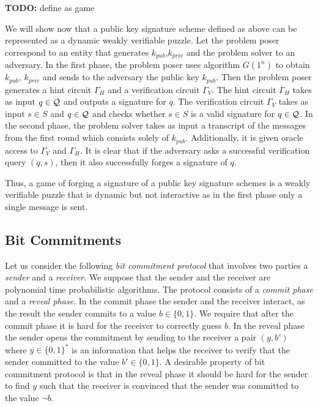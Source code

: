 %
\begin{todo}
  \textbf{TODO:} define as game
\end{todo}
We will show now that a public key signature scheme defined as above can be represented as a dynamic weakly verifiable puzzle.
Let the problem poser correspond to an entity that generates $k_{pub}$,$k_{priv}$ and the problem solver to an adversary.
In the first phase, the problem poser uses algorithm $G(1^n)$ to obtain $k_{pub}$, $k_{priv}$ and sends to the adversary the public key $k_{pub}$.
Then the problem poser generates a hint circuit $\Gamma_H$ and a verification circuit $\Gamma_V$.
The hint circuit $\Gamma_H$ takes as input $q \in \mathcal{Q}$ and outputs a signature for $q$. The verification circuit
$\Gamma_V$ takes as input $s \in S$ and $q \in \mathcal{Q}$ and checks whether $s \in S$ is a valid signature for $q \in \mathcal{Q}$.
In the second phase, the problem solver takes as input a transcript of the messages from the first round which consists solely of $k_{pub}$.
Additionally, it is given oracle access to $\Gamma_V$ and $\Gamma_H$.
It is clear that if the adversary asks a successful verification query $(q,s)$,
then it also successfully forges a signature of $q$.

Thus, a game of forging a signature of a public key signature schemes is a weakly verifiable puzzle that
is dynamic but not interactive as in the first phase only a single message is sent.
%
\subsection{Bit Commitments}
Let us consider the following \textit{bit commitment protocol} that involves two parties a \textit{sender} and a \textit{receiver}.
We suppose that the sender and the receiver are polynomial time probabilistic algorithms.
The protocol consists of a \textit{commit phase} and a \textit{reveal phase}.
In the commit phase the sender and the receiver interact, as the result the sender commits to a value $b \in \{0,1\}$.
We require that after the commit phase it is hard for the receiver to correctly guess $b$.
In the reveal phase the sender opens the commitment by sending to the receiver a pair $(y,b')$ where $y \in \{0,1\}^{*}$ is an information
that helps the receiver to verify that the sender committed to the value $b' \in \{0,1\}$.
A desirable property of bit commitment protocol is that in the reveal phase it should be hard for the sender to find $y$ such that the receiver
is convinced that the sender was committed to the value $\lnot b$.

